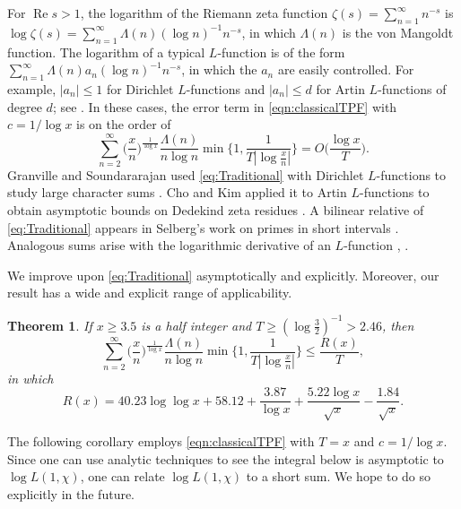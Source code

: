 \documentclass[10pt,reqno]{amsart}
\theoremstyle{plain}
\newtheorem{theorem}{Theorem}
\theoremstyle{definition}
\renewcommand{\Re}{\operatorname{Re}}
\begin{document}
For $\Re{s} > 1$, the logarithm of the Riemann zeta function $\zeta(s) = \sum_{n=1}^{\infty} n^{-s}$ is 
$\log \zeta(s) = \sum_{n=1}^{\infty} \Lambda(n)(\log n)^{-1}n^{-s}$, in which $\Lambda(n)$ 
is the von Mangoldt function.  The logarithm of a typical $L$-function is of the form
$\sum_{n=1}^{\infty} \Lambda(n)a_n(\log n)^{-1}n^{-s}$,
in which the $a_n$ are easily controlled.  For example, $|a_n| \leq 1$
for Dirichlet $L$-functions and $|a_n|\leq d$ for Artin $L$-functions of degree $d$; see \cite[Ch.~5]{iwaniec2004analytic}.
In these cases, the error term in \eqref{eqn:classicalTPF} with $c = 1/\log{x}$ is on the order of
\begin{equation}\label{eq:Traditional}
    \sum_{n=2}^{\infty} \Big( \frac{x}{n}\Big)^{\frac{1}{\log x}}  \frac{ \Lambda(n)}{n \log n}
    \min\Big\{ 1 , \frac{1}{T | \log \frac{x}{n} |} \Big\} 
    = O\bigg( \frac{\log x}{T} \bigg).
\end{equation}
Granville and Soundararajan used \eqref{eq:Traditional} with Dirichlet $L$-functions
to study large character sums \cite[(8.1)]{GranvilleSound}.
Cho and Kim applied it to Artin $L$-functions to obtain asymptotic bounds on Dedekind zeta residues \cite[Prop.~3.1]{ChoKim}.
A bilinear relative of \eqref{eq:Traditional} appears in Selberg's work on primes in short intervals \cite[Lem.~4]{Selberg}.  
Analogous sums arise with the logarithmic derivative of an $L$-function \cite[p.~106]{Davenport}, \cite[p.~44]{Patterson}.

We improve upon \eqref{eq:Traditional} asymptotically and explicitly.  Moreover, our result has a wide and explicit range of applicability.

\begin{theorem}\label{Theorem:LogLog}
If $x \geq 3.5$ is a half integer and $T \geq (\log \frac{3}{2})^{-1} > 2.46$, then
\begin{equation}\label{eq:MainSum}
    \sum_{n=2}^{\infty} \Big( \frac{x}{n}\Big)^{\frac{1}{\log x}}  \frac{ \Lambda(n)}{n \log n} \min\Big\{ 1 , \frac{1}{T | \log \frac{x}{n} |} \Big\} 
    \leq
    \frac{R(x)}{T},
\end{equation}
in which
\begin{equation}\label{eq:Rx}
    R(x) = 
    40.23 \log \log x
    +58.12
    +\frac{3.87}{\log x}
    +\frac{5.22 \log x}{\sqrt{x}}
    -\frac{1.84}{\sqrt{x}}.
\end{equation}
\end{theorem}

The following corollary employs \eqref{eqn:classicalTPF} with $T=x$ and $c = 1/\log{x}$. 
Since one can use analytic techniques to see the integral below is asymptotic to $\log{L(1,\chi)}$, 
one can relate $\log{L(1,\chi)}$ to a short sum.  We hope to do so explicitly in the future.
\end{document}
